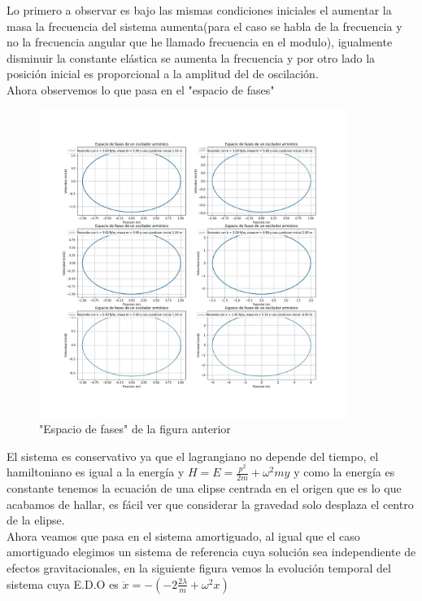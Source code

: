 \documentclass[12pt,a4paper]{article}
\begin{document}
Lo primero a observar es bajo las mismas condiciones iniciales el aumentar la masa la frecuencia del sistema aumenta(para el caso se habla de la frecuencia y no la frecuencia angular que he llamado frecuencia en el modulo), igualmente disminuir la constante elástica se aumenta la frecuencia y por otro lado la posición inicial es proporcional a la amplitud del de oscilación.
\\

Ahora observemos lo que pasa en el "espacio de fases"

\begin{figure}[H]
    \centering
    \includegraphics[width=10cm]{fases_oscilador.jpg}
    \caption{"Espacio de fases" de la figura anterior}
    \label{fig:osciladorfases}
\end{figure}

El sistema es conservativo ya que el lagrangiano no depende del tiempo, el hamiltoniano es igual a la energía y $H = E = \frac{p^2}{2m} +\omega^2 m y$ y como la energía es constante tenemos la ecuación de una elipse centrada en el origen que es lo que acabamos de hallar, es fácil ver que considerar la gravedad solo desplaza el centro de la elipse. 
\\

Ahora veamos que pasa en el sistema amortiguado, al igual que el caso amortiguado elegimos un sistema de referencia cuya solución sea independiente de efectos gravitacionales, en la siguiente figura vemos la evolución temporal del sistema cuya E.D.O es $\ddot{x} = -( - 2 \frac{2 \lambda}{m} + \omega^2 x)$
\end{document}
